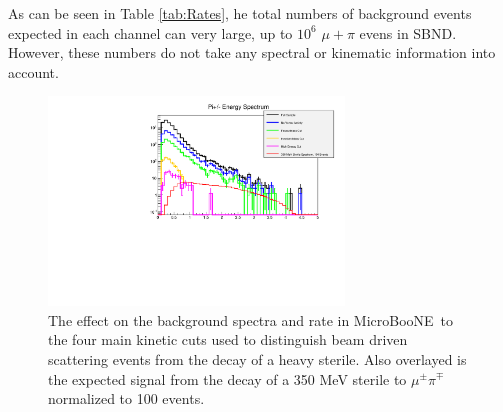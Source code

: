 \documentclass[11pt, a4paper]{article}
\def\muboone{MicroBooNE}
\begin{document}
As can be seen in Table \ref{tab:Rates}, he total numbers of background events expected in each channel can very large, up to $10^6$ $\mu+\pi$ evens in SBND. However, these numbers do not take any spectral or kinematic information into account. 
\begin{figure}[t]
\center
\includegraphics[width=0.7\textwidth]{figures/cuts.pdf}
\caption{\label{fig:cuts} The effect on the background spectra and rate in \muboone\ to the four main kinetic cuts used to distinguish beam driven scattering events from the decay of a heavy sterile. Also overlayed is the expected signal from the decay of a 350 MeV sterile to $\mu^\pm \pi^\mp$ normalized to 100 events.}
\end{figure}
\end{document}
